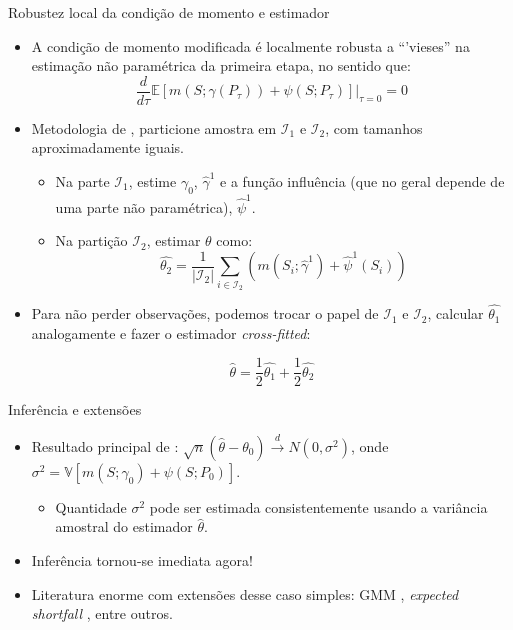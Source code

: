 \documentclass[11pt]{beamer}
\begin{document}
\begin{frame}{Robustez local da condição de momento e estimador}
\begin{itemize}
	\item A condição de momento modificada é localmente robusta a ``'vieses'' na estimação não paramétrica da primeira etapa, no sentido que:
	$$\frac{d}{d \tau} \mathbb{E}[m(S;\gamma(P_{\tau})) + \psi(S;P_{\tau})]\Big|_{\tau=0} = 0$$
	\item Metodologia de \cite{Chernozhukov2018}, particione amostra em $\mathcal{I}_1$ e $\mathcal{I}_2$, com tamanhos aproximadamente iguais.
	\begin{itemize}
		\item Na parte $\mathcal{I}_1$, estime $\gamma_0$, $\hat{\gamma}^1$ e a função influência (que no geral depende de uma parte não paramétrica), $\hat{\psi}^1$.
		\item Na partição $\mathcal{I}_2$, estimar $\theta$ como:
		\begin{equation}
			\hat{\theta_2} = \frac{1}{|\mathcal{I}_2|}\sum_{i\in \mathcal{I}_2} (m(S_i;\hat{\gamma}^1) + \hat{\psi}^1(S_i))
		\end{equation}
	\end{itemize}
	\item Para não perder observações, podemos trocar o papel de $\mathcal{I}_1$ e $\mathcal{I}_2$, calcular $\hat{\theta_1}$ analogamente e fazer o estimador \textit{cross-fitted}:
	
	$$\hat{\theta} = \frac{1}{2} \hat{\theta_1} + \frac{1}{2} \hat{\theta_2}$$

\end{itemize}
\end{frame}

\begin{frame}{Inferência e extensões}
	\begin{itemize}

		\item Resultado principal de \cite{Chernozhukov2018}: $\sqrt{n}(\hat{\theta} - \theta_0) \overset{d}{\to}N(0, \sigma^2)$, onde $\sigma^2 = \mathbb{V}[m(S;\gamma_0) + \psi(S;P_0)]$.
	\begin{itemize}
		\item Quantidade $\sigma^2$ pode ser estimada consistentemente usando a variância amostral do estimador $\hat{\theta}$.
	\end{itemize}
	\item Inferência tornou-se imediata agora!
	\item Literatura enorme com extensões desse caso simples: GMM \citep{Chernozhukov2018,Chernozhukov2022},  \textit{expected shortfall }\citep{chetverikov2022weightedaverage}, entre outros.
	\end{itemize}
\end{frame}
\appendix
\end{document}
